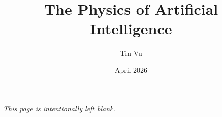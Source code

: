 \documentclass[12pt]{report}
\title{The Physics of Artificial Intelligence}
\author{Tin Vu}
\date{April 2026}
\theoremstyle{definition}
\theoremstyle{plain}
\begin{document}
\maketitle
\newpage
\begin{center}
	\textit{This page is intentionally left blank.}
\end{center}


\tableofcontents
\listoffigures







\end{document}
